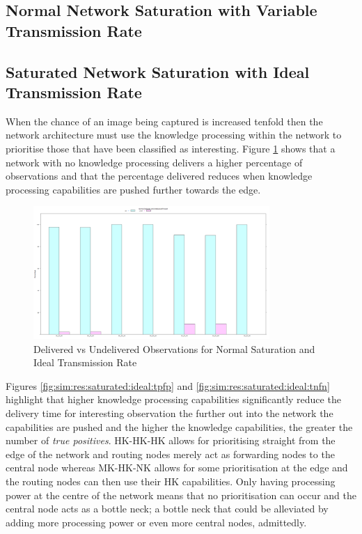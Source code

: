 \subsection{Normal Network Saturation with Variable Transmission Rate}

\subsection{Saturated Network Saturation with Ideal Transmission Rate}

When the chance of an image being captured is increased tenfold then the network architecture must use the knowledge processing within the network to prioritise those that have been classified as interesting. Figure \ref{fig:sim:res:saturated:ideal:delundel} shows that a network with no knowledge processing delivers a higher percentage of observations and that the percentage delivered reduces when knowledge processing capabilities are pushed further towards the edge.

	\begin{figure}[h]
	\centering
	\includegraphics[width=0.8\textwidth]{Chap7/figures/plots/normal_ideal/delvsundel_percent.png}
	\caption{Delivered vs Undelivered Observations for Normal Saturation and Ideal Transmission Rate}
	\label{fig:sim:res:saturated:ideal:delundel}
	\end{figure}

	Figures \ref{fig:sim:res:saturated:ideal:tpfp} and \ref{fig:sim:res:saturated:ideal:tnfn} highlight that higher knowledge processing capabilities significantly reduce the delivery time for interesting observation the further out into the network the capabilities are pushed and the higher the knowledge capabilities, the greater the number of \textit{true positives}. HK-HK-HK allows for prioritising straight from the edge of the network and routing nodes merely act as forwarding nodes to the central node whereas MK-HK-NK allows for some prioritisation at the edge and the routing nodes can then use their HK capabilities. Only having processing power at the centre of the network means that no prioritisation can occur and the central node acts as a bottle neck; a bottle neck that could be alleviated by adding more processing power or even more central nodes, admittedly.

